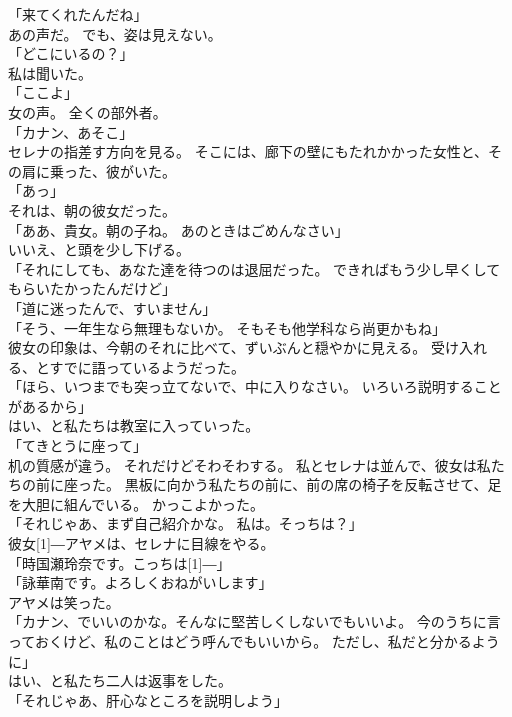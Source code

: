 \documentclass[../IHMain]{subfiles}
\begin{document}
「来てくれたんだね」\\
あの声だ。
でも、姿は見えない。\\
「どこにいるの？」\\
私は聞いた。\\
「ここよ」\\
女の声。
全くの部外者。\\
「カナン、あそこ」\\
セレナの指差す方向を見る。
そこには、廊下の壁にもたれかかった女性と、その肩に乗った、彼がいた。\\
「あっ」\\
それは、朝の彼女だった。\\
「ああ、貴女。朝の子ね。
あのときはごめんなさい」\\
いいえ、と頭を少し下げる。\\
「それにしても、あなた達を待つのは退屈だった。
できればもう少し早くしてもらいたかったんだけど」\\
「道に迷ったんで、すいません」\\
「そう、一年生なら無理もないか。
そもそも他学科なら尚更かもね」\\
彼女の印象は、今朝のそれに比べて、ずいぶんと穏やかに見える。
受け入れる、とすでに語っているようだった。\\
「ほら、いつまでも突っ立てないで、中に入りなさい。
いろいろ説明することがあるから」\\
はい、と私たちは教室に入っていった。\\
「てきとうに座って」\\
机の質感が違う。
それだけどそわそわする。
私とセレナは並んで、彼女は私たちの前に座った。
黒板に向かう私たちの前に、前の席の椅子を反転させて、足を大胆に組んでいる。
かっこよかった。\\
「それじゃあ、まず自己紹介かな。
私は。そっちは？」\\
彼女\scalebox{3}[1]{―}アヤメは、セレナに目線をやる。\\
「時国瀬玲奈です。こっちは\scalebox{3}[1]{―}」\\
「詠華南です。よろしくおねがいします」\\
アヤメは笑った。\\
「カナン、でいいのかな。そんなに堅苦しくしないでもいいよ。
今のうちに言っておくけど、私のことはどう呼んでもいいから。
ただし、私だと分かるように」\\
はい、と私たち二人は返事をした。\\
「それじゃあ、肝心なところを説明しよう」\\
\end{document}
